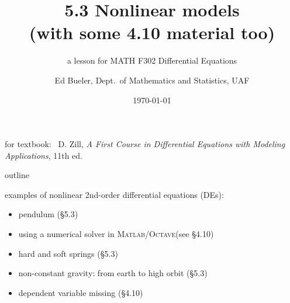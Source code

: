 \documentclass[urlcolor=blue,dvipsnames]{beamer}
\title{5.3 Nonlinear models \\ (with some 4.10 material too)}
\subtitle{a lesson for MATH F302 Differential Equations}
\author{Ed Bueler, Dept.~of Mathematics and Statistics, UAF}
\date{\tiny \today}
\newcommand{\Matlab}{\textsc{Matlab}\xspace}
\newcommand{\Octave}{\textsc{Octave}\xspace}
\begin{document}


\begin{frame}
\titlepage

\centerline{\tiny for textbook: \, D. Zill, \emph{A First Course in Differential Equations with Modeling Applications}, 11th ed.}
\end{frame}


\begin{frame}{outline}

examples of nonlinear 2nd-order differential equations (DEs):

\begin{itemize}
\item pendulum (\S 5.3)
\item using a numerical solver in \Matlab/\Octave (see \S4.10)
\item hard and soft springs (\S 5.3)
\item non-constant gravity: from earth to high orbit (\S 5.3)
\item dependent variable missing (\S 4.10)
\end{itemize}
\end{frame}
\end{document}
